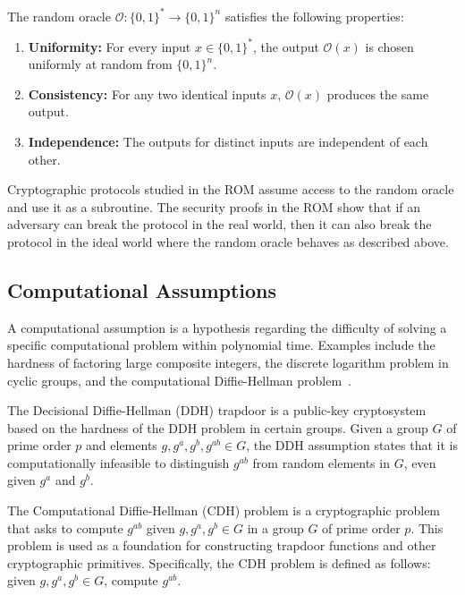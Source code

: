 \documentclass{iacrtrans}
\begin{document}
\begin{definition}
    The random oracle $\mathcal{O}: \{0,1\}^* \to \{0,1\}^n$ satisfies the following properties:
    \begin{enumerate}
        \item \textbf{Uniformity:} For every input $x \in \{0,1\}^*$, the output $\mathcal{O}(x)$ is chosen uniformly at random from $\{0,1\}^n$.
        \item \textbf{Consistency:} For any two identical inputs $x$, $\mathcal{O}(x)$ produces the same output.
        \item \textbf{Independence:} The outputs for distinct inputs are independent of each other.
    \end{enumerate}
\end{definition}

Cryptographic protocols studied in the ROM assume access to the random oracle and use it as a subroutine. The security proofs in the ROM show that if an adversary can break the protocol in the real world, then it can also break the protocol in the ideal world where the random oracle behaves as described above.

\subsection{Computational Assumptions}

A computational assumption is a hypothesis regarding the difficulty of solving a specific computational problem within polynomial time. Examples include the hardness of factoring large composite integers, the discrete logarithm problem in cyclic groups, and the computational Diffie-Hellman problem~\cite{DifHel76}.

\begin{definition}
	The Decisional Diffie-Hellman (DDH) trapdoor is a public-key cryptosystem based on the hardness of the DDH problem in certain groups. Given a group $G$ of prime order $p$ and elements $g, g^a, g^b, g^{ab} \in G$, the DDH assumption states that it is computationally infeasible to distinguish $g^{ab}$ from random elements in $G$, even given $g^a$ and $g^b$.
\end{definition}

\begin{definition}
	The Computational Diffie-Hellman (CDH) problem is a cryptographic problem that asks to compute $g^{ab}$ given $g, g^a, g^b \in G$ in a group $G$ of prime order $p$. This problem is used as a foundation for constructing trapdoor functions and other cryptographic primitives. Specifically, the CDH problem is defined as follows: given $g, g^a, g^b \in G$, compute $g^{ab}$.
\end{definition}
\end{document}
